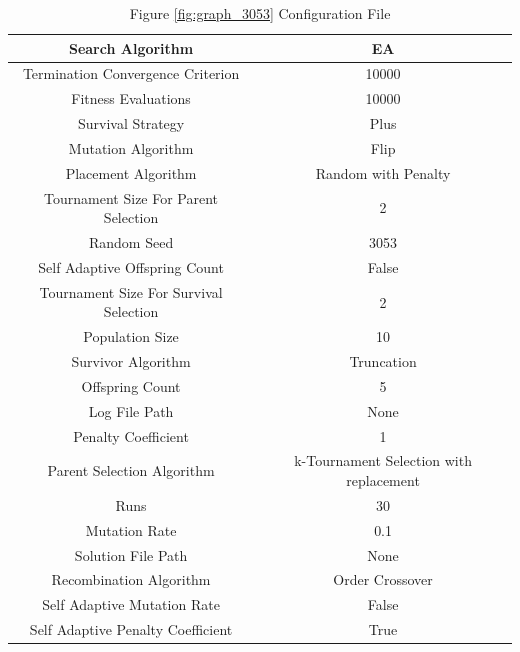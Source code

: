 \documentclass{standalone}
\begin{document}
\begin{table}[!htb]
	\centering
	\caption{Figure \ref{fig:graph_3053} Configuration File}
	\label{tab:graph_3053}
	\begin{tabular}{| c | c |}
		\hline
		Search Algorithm		& EA		 \\
		\hline
		Termination Convergence Criterion		& 10000		 \\
		\hline
		Fitness Evaluations		& 10000		 \\
		\hline
		Survival Strategy		& Plus		 \\
		\hline
		Mutation Algorithm		& Flip		 \\
		\hline
		Placement Algorithm		& Random with Penalty		 \\
		\hline
		Tournament Size For Parent Selection		& 2		 \\
		\hline
		Random Seed		& 3053		 \\
		\hline
		Self Adaptive Offspring Count		& False		 \\
		\hline
		Tournament Size For Survival Selection		& 2		 \\
		\hline
		Population Size		& 10		 \\
		\hline
		Survivor Algorithm		& Truncation		 \\
		\hline
		Offspring Count		& 5		 \\
		\hline
		Log File Path		& None		 \\
		\hline
		Penalty Coefficient		& 1		 \\
		\hline
		Parent Selection Algorithm		& k-Tournament Selection with replacement		 \\
		\hline
		Runs		& 30		 \\
		\hline
		Mutation Rate		& 0.1		 \\
		\hline
		Solution File Path		& None		 \\
		\hline
		Recombination Algorithm		& Order Crossover		 \\
		\hline
		Self Adaptive Mutation Rate		& False		 \\
		\hline
		Self Adaptive Penalty Coefficient		& True		 \\
		\hline
	\end{tabular}
\end{table}
\end{document}
